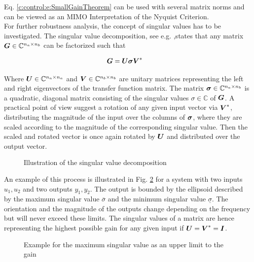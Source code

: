 Eq. \ref{c:control:e:SmallGainTheorem} can be used with several matrix norms and can be viewed as an MIMO Interpretation of the Nyquist Criterion. \\

For further robustness analysis, the concept of singular values has to be investigated. The singular value decomposition, see e.g. \cite[p.144 f.]{Zeidler2013},states that any matrix $\mbox{\boldmath$G$} \in \mathbb{C}^{n_a\times n_b}$ can be factorized such that

\begin{align}
\mbox{\boldmath$G$} &= \mbox{\boldmath$U$}\mbox{\boldmath$\sigma$}\mbox{\boldmath$V$}^*
\label{c:control:e:SVD}
\end{align}

Where $\mbox{\boldmath$U$} \in \mathbb{C}^{n_a \times n_a}$ and $\mbox{\boldmath$V$} \in \mathbb{C}^{n_b \times n_b} $ are unitary matrices representing the left and right eigenvectors of the transfer function matrix. The matrix $\mbox{\boldmath$\sigma$} \in \mathbb{C}^{n_a \times n_b}$ is a quadratic, diagonal matrix consisting of the singular values $\sigma \in \mathbb{C}$ of $\mbox{\boldmath$G$}$. A practical point of view suggest a rotation of any given input vector via $\mbox{\boldmath$V$}^*$, distributing the magnitude of the input over the columns of $\mbox{\boldmath$\sigma$}$, where they are scaled according to the magnitude of the corresponding singular value. Then the scaled and rotated vector is once again rotated by $\mbox{\boldmath$U$}$ and distributed over the output vector. \\

\begin{figure}[H]
  \centering
  
  \caption{Illustration of the singular value decomposition}
  \label{c:identification:f:svd}
\end{figure}

An example of this process is illustrated in Fig. \ref{c:control:f:SVD} for a system with two inputs $u_1,u_2$ and two outputs $y_1,y_2$. The output is bounded by the ellipsoid described by the maximum singular value $\overline{\sigma}$ and the minimum singular value $\underline{\sigma}$. The orientation and the magnitude of the outputs change depending on the frequency but will never exceed these limits. The singular values of a matrix are hence representing the highest possible gain for any given input if $\mbox{\boldmath$U$} = \mbox{\boldmath$V$}^* = \mbox{\boldmath$I$}$.

\begin{figure}[H]
\centering

\caption{Example for the maximum singular value as an upper limit to the gain}
\label{c:control:f:SVD}
\end{figure}

